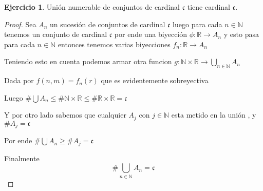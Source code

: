 \documentclass[12pt]{article}
\newcommand{\R}{\mathbb{R}}
\newcommand{\N}{\mathbb{N}}
\newcommand{\ra}{\rightarrow}
\theoremstyle{definition}
\newtheorem{ej}{Ejercicio}
\begin{document}
\noindent
\begin{ej} Unión numerable de conjuntos de cardinal $\mathfrak{c}$ tiene cardinal $\mathfrak{c}$.
\begin{proof}
  Sea $A_{n}$ un sucesión de conjuntos de cardinal $\mathfrak{c}$ luego para cada $n \in \N$ tenemos un conjunto de cardinal $\mathfrak{c}$ por ende una biyección $\phi :\R \ra A_{n}$ y esto pasa para cada $n \in \N$ entonces tenemos varias biyecciones $f_{n} : \R \ra A_{n}$

  Teniendo esto en cuenta podemos armar otra funcion $g: \N \times \R \ra \bigcup_{n \in \N} A_{n} $ 

  Dada por $f(n,m) = f_{n}(r)$ que es evidentemente sobreyectiva 

  Luego $\# \bigcup A_{n} \leq \# \N \times \R \leq \# \R \times \R = \mathfrak{c}$

  Y por otro lado sabemos que cualquier $A_{j}$ con $j \in \N$ esta metido en la unión , y $\# A_{j} = \mathfrak{c}$

  Por ende $\# \bigcup A_{n} \geq \# A_{j} = \mathfrak{c}$

  Finalmente $$\# \bigcup_{n \in \N} A_{n} = \mathfrak{c}$$
\end{proof}
\end{ej}
\end{document}
